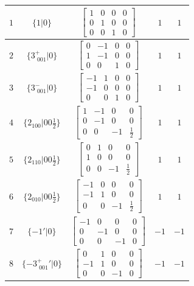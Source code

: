 \documentclass[fleqn,8pt]{jsarticle}
\begin{document}
\begin{longtable}{ccccc}
$ 1 $ & $ \{1|0\} $ & $ \begin{bmatrix} 1 & 0 & 0 & 0 \\ 0 & 1 & 0 & 0 \\ 0 & 0 & 1 & 0 \end{bmatrix} $ & $ 1 $ & $ 1 $ \\ \hline
$ 2 $ & $ \{3^{+}_{\,\,001}|0\} $ & $ \begin{bmatrix} 0 & -1 & 0 & 0 \\ 1 & -1 & 0 & 0 \\ 0 & 0 & 1 & 0 \end{bmatrix} $ & $ 1 $ & $ 1 $ \\ \hline
$ 3 $ & $ \{3^{-}_{\,\,001}|0\} $ & $ \begin{bmatrix} -1 & 1 & 0 & 0 \\ -1 & 0 & 0 & 0 \\ 0 & 0 & 1 & 0 \end{bmatrix} $ & $ 1 $ & $ 1 $ \\ \hline
$ 4 $ & $ \{2{}_{100}|0 0 \frac{1}{2}\} $ & $ \begin{bmatrix} 1 & -1 & 0 & 0 \\ 0 & -1 & 0 & 0 \\ 0 & 0 & -1 & \frac{1}{2} \end{bmatrix} $ & $ 1 $ & $ 1 $ \\ \hline
$ 5 $ & $ \{2{}_{110}|0 0 \frac{1}{2}\} $ & $ \begin{bmatrix} 0 & 1 & 0 & 0 \\ 1 & 0 & 0 & 0 \\ 0 & 0 & -1 & \frac{1}{2} \end{bmatrix} $ & $ 1 $ & $ 1 $ \\ \hline
$ 6 $ & $ \{2{}_{010}|0 0 \frac{1}{2}\} $ & $ \begin{bmatrix} -1 & 0 & 0 & 0 \\ -1 & 1 & 0 & 0 \\ 0 & 0 & -1 & \frac{1}{2} \end{bmatrix} $ & $ 1 $ & $ 1 $ \\ \hline
$ 7 $ & $ \{-1{}'|0\} $ & $ \begin{bmatrix} -1 & 0 & 0 & 0 \\ 0 & -1 & 0 & 0 \\ 0 & 0 & -1 & 0 \end{bmatrix} $ & $ -1 $ & $ -1 $ \\ \hline
$ 8 $ & $ \{-3^{+}_{\,\,001}{}'|0\} $ & $ \begin{bmatrix} 0 & 1 & 0 & 0 \\ -1 & 1 & 0 & 0 \\ 0 & 0 & -1 & 0 \end{bmatrix} $ & $ -1 $ & $ -1 $ \\ \hline

\end{longtable}
\end{document}
